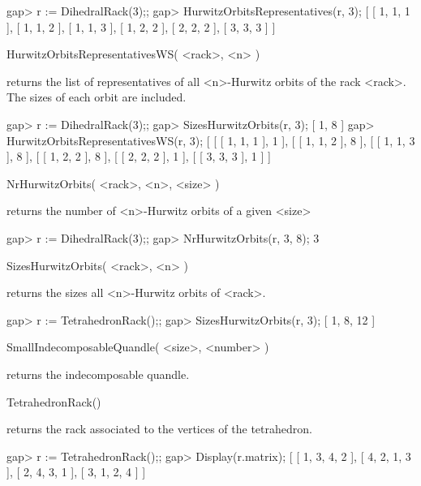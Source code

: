 \beginexample
gap> r := DihedralRack(3);;
gap> HurwitzOrbitsRepresentatives(r, 3);
[ [ 1, 1, 1 ], [ 1, 1, 2 ], [ 1, 1, 3 ], [ 1, 2, 2 ], [ 2, 2, 2 ], [ 3, 3, 3 ] ]
\endexample

\>HurwitzOrbitsRepresentativesWS( <rack>, <n> )

returns the list of representatives of all <n>-Hurwitz orbits of the rack
<rack>. The sizes of each orbit are included.

\beginexample
gap> r := DihedralRack(3);;
gap> SizesHurwitzOrbits(r, 3);
[ 1, 8 ]
gap> HurwitzOrbitsRepresentativesWS(r, 3);
[ [ [ 1, 1, 1 ], 1 ], [ [ 1, 1, 2 ], 8 ], [ [ 1, 1, 3 ], 8 ], [ [ 1, 2, 2 ], 8 ], [ [ 2, 2, 2 ], 1 ], [ [ 3, 3, 3 ], 1 ] ]
\endexample

\>NrHurwitzOrbits( <rack>, <n>, <size> )

returns the number of <n>-Hurwitz orbits of a given <size>

\beginexample
gap> r := DihedralRack(3);;
gap> NrHurwitzOrbits(r, 3, 8);
3
\endexample

\>SizesHurwitzOrbits( <rack>, <n> )

returns the sizes all <n>-Hurwitz orbits of <rack>.

\beginexample
gap> r := TetrahedronRack();;
gap> SizesHurwitzOrbits(r, 3);
[ 1, 8, 12 ]
\endexample

\>SmallIndecomposableQuandle( <size>, <number> )

returns the indecomposable quandle.

\>TetrahedronRack()

returns the rack associated to the vertices of the tetrahedron.

\beginexample
gap> r := TetrahedronRack();;
gap> Display(r.matrix);
[ [  1,  3,  4,  2 ],
  [  4,  2,  1,  3 ],
  [  2,  4,  3,  1 ],
  [  3,  1,  2,  4 ] ]
\endexample


